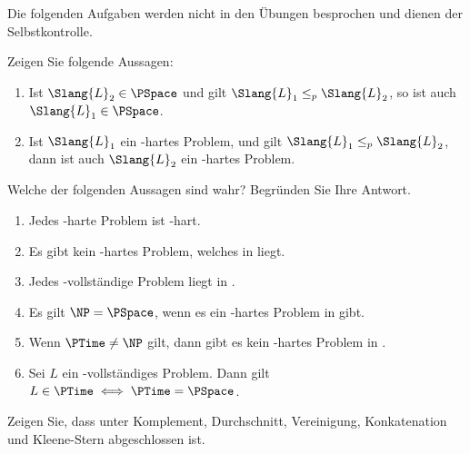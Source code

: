 \documentclass[german]{latteachCD}[2017/03/28]
\begin{document}
\maketitle

\begin{mdframed}
  Die folgenden Aufgaben werden nicht in den Übungen besprochen und dienen der
  Selbstkontrolle.

  \renewcommand{\theexercise}{\BoldGreek{exercise}}
  \setcounter{exercise}{3}

  \begin{exercise}
    Zeigen Sie folgende Aussagen:
    \begin{enumerate}
    \item Ist $\Slang{L}_{2} \in \PSpace$ und gilt $\Slang{L}_{1} \leq_{p}
      \Slang{L}_{2}$, so ist auch $\Slang{L}_{1} \in \PSpace$.
    \item Ist $\Slang{L}_{1}$ ein \PSpace-hartes Problem, und gilt
      $\Slang{L}_{1} \leq_{p} \Slang{L}_{2}$, dann ist auch $\Slang{L}_{2}$ ein
      \PSpace-hartes Problem.
    \end{enumerate}
  \end{exercise}

  \begin{exercise}
    Welche der folgenden Aussagen sind wahr?  Begründen Sie Ihre Antwort.
    \begin{enumerate}
    \item Jedes \PSpace-harte Problem ist \NP-hart.
    \item Es gibt kein \NP-hartes Problem, welches in \PSpace{} liegt.
    \item Jedes \NP-vollständige Problem liegt in \PSpace.
    \item Es gilt $\NP = \PSpace$, wenn es ein \PSpace-hartes Problem in \NP{}
      gibt.
    \item Wenn $\PTime \neq \NP$ gilt, dann gibt es kein \NP-hartes Problem in
      \PTime.
    \item Sei $L$ ein \PSpace-vollständiges Problem.  Dann gilt $L \in \PTime
      \iff \PTime = \PSpace$.
    \end{enumerate}
  \end{exercise}
\end{mdframed}

\vspace*{0.5\baselineskip}

\setcounter{exercise}{0}

\begin{exercise}
  Zeigen Sie, dass \PSpace{} unter Komplement, Durchschnitt, Vereinigung,
  Konkatenation und Kleene-Stern abgeschlossen ist.
\end{exercise}
\end{document}
